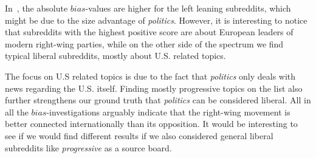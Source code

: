 \documentclass[runningheads,a4paper]{llncs}
\begin{document}
	In~, the absolute $bias$-values are higher for the left leaning subreddits, which might be due to the size advantage of \textit{politics}.
	However, it is interesting to notice that subreddits with the highest positive score are about European leaders of modern right-wing parties,
	while on the other side of the spectrum we find typical liberal subreddits, mostly about U.S. related topics.
	
	
	The focus on U.S related topics is due to the fact that \textit{politics} only deals with news regarding the U.S. itself. Finding mostly progressive topics on the list also further strengthens our ground truth that \textit{politics} can be considered liberal. All in all the $bias$-investigations arguably indicate that the right-wing movement is better connected internationally than its opposition. It would be interesting to see if we would find different results if we also considered general liberal subreddits like \textit{progressive} as a source board.
	
	
	
\end{document}
